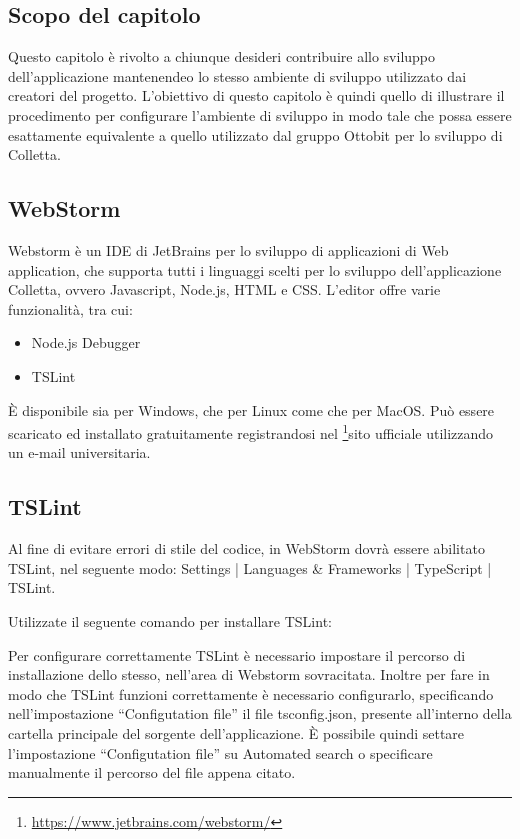 \subsection{Scopo del capitolo}
Questo capitolo è rivolto a chiunque desideri contribuire allo sviluppo dell'applicazione mantenendeo lo stesso ambiente di sviluppo utilizzato dai creatori del progetto.
L'obiettivo di questo capitolo è quindi quello di illustrare il procedimento per configurare l'ambiente di sviluppo in modo tale che possa essere esattamente equivalente a quello utilizzato dal gruppo Ottobit per lo sviluppo di Colletta.

\subsection{WebStorm}
Webstorm è un IDE di JetBrains per lo sviluppo di applicazioni di Web application, che supporta tutti i linguaggi scelti per lo sviluppo dell'applicazione Colletta, ovvero Javascript, Node.js, HTML e CSS.
L'editor offre varie funzionalità, tra cui:
\begin{itemize}
	\item Node.js Debugger
	\item TSLint
\end{itemize}
È disponibile sia per Windows, che per Linux come che per MacOS.
Può essere scaricato ed installato gratuitamente registrandosi nel \footnote{\url{https://www.jetbrains.com/webstorm/}}sito ufficiale utilizzando un e-mail universitaria.

\subsection{TSLint}
Al fine di evitare errori di stile del codice, in WebStorm dovrà essere abilitato TSLint, nel seguente modo: Settings | Languages \& Frameworks | TypeScript | TSLint.

Utilizzate il seguente comando per installare TSLint:
\begin{center}
	\noindent{}
\end{center}
Per configurare correttamente TSLint è necessario impostare il percorso di installazione dello stesso, nell'area di Webstorm sovracitata.
Inoltre per fare in modo che TSLint funzioni correttamente è necessario configurarlo, specificando nell'impostazione ``Configutation file'' il file tsconfig.json, presente all'interno della cartella principale del sorgente dell'applicazione. È possibile quindi settare l'impostazione ``Configutation file'' su Automated search o specificare manualmente il percorso del file appena citato.

